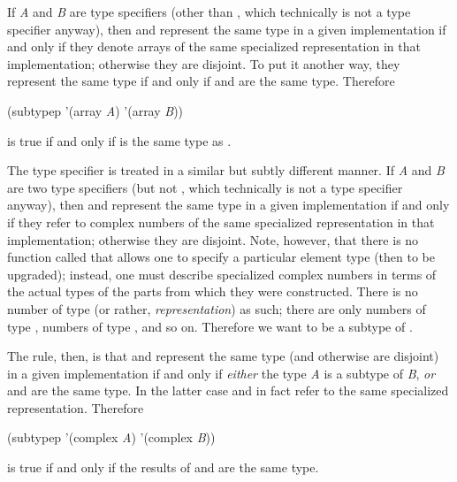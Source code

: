 \begin{defun}[Function]
\begin{new}
If \emph{A} and \emph{B} are type specifiers (other than \cdf{*}, which technically
is not a type specifier anyway), then 
and  represent the same type in a given implementation
if and only if they denote arrays
of the same specialized representation in that implementation;
otherwise they are disjoint.
To put it another way, they represent the same type
if and only if
 and
 are the same type.
Therefore
\begin{lisp}
(subtypep '(array \emph{A}) '(array \emph{B}))
\end{lisp}
is true if and only if
is the same type as
.

The  type specifier is treated in a similar but subtly different
manner.
If \emph{A} and \emph{B} are two type specifiers (but not \cdf{*}, which technically
is not a type specifier anyway), then 
and  represent the same type in a given implementation
if and only if they refer to complex numbers
of the same specialized representation in that implementation;
otherwise they are disjoint.
Note, however, that there is no function called  that
allows one to specify a particular element type (then to be upgraded);
instead, one must describe specialized complex numbers in terms of
the actual types of the parts from which they were constructed.
There is no number of type (or rather, \emph{representation\/})
 as such; there are only numbers of type ,
numbers of type ,
and so on.  Therefore we want  to
be a subtype of .

The rule, then, is that 
and  represent the same type (and otherwise are disjoint)
in a given implementation
if and only if \emph{either} the type \emph{A} is a subtype of \emph{B}, \emph{or}
 and
 are the same type.
In the latter case 
and  in fact refer to the same specialized representation.
Therefore
\begin{lisp}
(subtypep '(complex \emph{A}) '(complex \emph{B}))
\end{lisp}
is true if and only if the results of
 and
 are the same type.


\end{new}
\end{defun}
